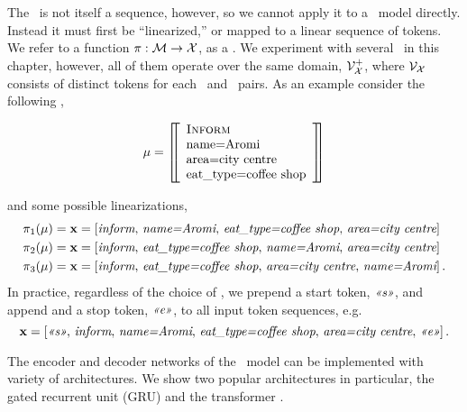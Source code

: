 The \meaningrepresentation~is not 
itself a sequence, however, so we cannot apply it to a 
\sequencetosequence~model
directly.
 Instead it must first be ``linearized,'' or mapped to a linear sequence of 
 tokens. We refer to a function $\pi : \mathcal{M} \rightarrow \mathcal{X}$,
 as a \linearizationstrategy. We experiment with several 
 \linearizationstrategies~in this chapter, however, all of them operate over
 the same domain, $\mathcal{V}_{\mathcal{X}}^+$, where $\mathcal{V}_{\mathcal{X}}$ consists of 
 distinct tokens for each \dialogueact~and \attributevalue~pairs. As an example
 consider the following \meaningrepresentation,
 \begin{singlespace}
  \[ \mu = \left[\!\!\left[\begin{array}{l} \textsc{Inform} \\ \textrm{name=Aromi}\\\textrm{area=city centre} \\ \textrm{eat\_type=coffee shop} \end{array}\right]\!\!\right] \]
 \end{singlespace}
\noindent and some possible linearizations,
 \begin{align*}
     \pi_1(\mu) & = \mathbf{x}= \left[\textit{inform},\,\textit{name=Aromi},\,\textit{eat\_type=coffee shop},\,\textit{area=city centre}\right] \\
     \pi_2(\mu) & = \mathbf{x}= \left[\textit{inform},\,\textit{eat\_type=coffee shop},\,\textit{name=Aromi},\,\textit{area=city centre}\right] \\
     \pi_3(\mu) & = \mathbf{x}= \left[\textit{inform},\,\textit{eat\_type=coffee shop},\,\textit{area=city centre},\,\textit{name=Aromi}\right].
 \end{align*}
In practice, regardless of the choice of \linearizationstrategy, we prepend a start token, $\textit{<<s>>}$,
and append and a stop token, $\textit{<<e>>}$, to all input token sequences, e.g.
\[ \mathbf{x} = \left[\textit{<<s>>},\,\textit{inform},\,\textit{name=Aromi},\,\textit{eat\_type=coffee shop},\,\textit{area=city centre},\,\textit{<<e>>}\right]. \]



The encoder and decoder networks of the \sequencetosequence~model can be implemented with variety
of architectures. We show two popular architectures in particular, the gated recurrent unit (GRU)
\citep{cho2014gru} and the transformer \citep{vaswani2017}.




